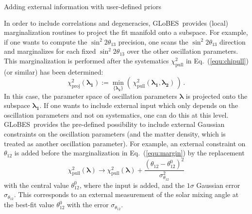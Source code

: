 \documentclass[12pt,a4paper]{article}
\makeatletter
\renewcommand{\section}{\@startsection{section}{1}{0em}{-\baselineskip}%
{\baselineskip}{\normalfont\large\bfseries}}
\newcommand{\eq}{Eq.}
\newcommand{\stheta}{\sin^2 2 \theta_{13}}
\newcommand{\GLOBES}{{\sf GLoBES}}
\newcommand{\equ}[1]{\eq~(\ref{equ:#1})}
\makeatother
\begin{document}
\section{Adding external information with user-defined priors}

In order to include correlations and degeneracies, \GLOBES\ provides
(local) marginalization routines to project the fit manifold onto
a subspace. For example, if one wants to compute the $\stheta$ precision,
one scans the $\stheta$ direction and marginalizes for each fixed $\stheta$
over the other oscillation parameters. This marginalization is performed
after the systematics $\chi^2_{\mathrm{pull}}$ in \equ{chipull} (or similar) 
has been determined:
\begin{equation}
 \chi^2_{\mathrm{proj}}(\boldsymbol{\lambda_1}) := \min_{\{ \boldsymbol{\lambda_2} \} } \left( \, \chi^2_{\mathrm{pull}} (\boldsymbol{\lambda_1} , \boldsymbol{\lambda_2} ) \, \right) \, .
\label{equ:margin}
\end{equation}
In this case, the parameter space of oscillation parameters 
$\boldsymbol{\lambda}$ is projected onto the subspace $\boldsymbol{\lambda_1}$.
If one wants to include external input which only depends on the oscillation
parameters and not on systematics, one can do this at this level. \GLOBES\ provides
the pre-defined possibility to include external Gaussian constraints on the 
oscillation parameters (and the matter density, which is treated as another
oscillation parameter). For example, an external constraint on $\theta_{12}$
is added before the marginalization in \equ{margin} by the replacement
\begin{equation}
 \chi^2_{\mathrm{pull}}(\boldsymbol{\lambda}) \rightarrow \chi^2_{\mathrm{pull}}(\boldsymbol{\lambda})  +
 \frac{(\theta_{12} - \theta_{12}^0)^2}{\sigma_{\theta_{12}}^2}
\label{equ:priors}
\end{equation}
with the central value $\theta_{12}^0$, where the input is added, and
the $1\sigma$ Gaussian error $\sigma_{\theta_{12}}$. This corresponds to an external
measurement of the solar mixing angle at the best-fit value $\theta_{12}^0$
with the error $\sigma_{\theta_{12}}$. 
\end{document}
